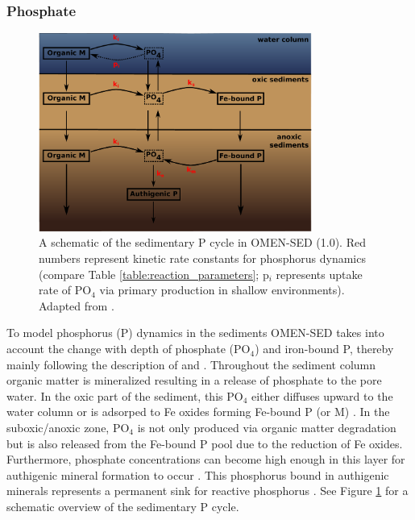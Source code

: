 \documentclass[gmd, manuscript]{copernicus}
\begin{document}
\subsubsection{Phosphate}
\begin{figure}[htbp]
\begin{center}
	\includegraphics[width=0.8\textwidth]{figures/P-cycle.pdf}
	\caption{A schematic of the sedimentary P cycle in OMEN-SED (1.0). Red numbers represent kinetic rate constants for phosphorus dynamics (compare Table \ref{table:reaction_parameters}; p$_i$ represents uptake rate of PO$_4$ 
	via primary production in shallow environments). Adapted from \citet{caroline_p_slomp_key_1996}.}
	\label{fig:P-cycle}
	\end{center}
\end{figure}
To model phosphorus (P) dynamics in the sediments OMEN-SED takes into account the change with depth of phosphate (PO$_4$) and iron-bound P, thereby mainly following the description of \citet{caroline_p_slomp_key_1996} 
and \citet{gypens_simple_2008}. Throughout the sediment column organic matter is mineralized resulting in a release of phosphate to the pore water. In the oxic part of the sediment, this PO$_4$ either 
diffuses upward to the water column or is adsorped to Fe oxides forming Fe-bound P (or M) \citep{slomp1998role}. In the suboxic/anoxic zone, PO$_4$ is not only produced via organic matter degradation but is 
also released from the Fe-bound P pool due to the reduction of Fe oxides. Furthermore, phosphate concentrations can become high enough in this layer for authigenic mineral formation to occur \citep{cappellen_mathematical_1988}. 
This phosphorus bound in authigenic minerals represents a permanent sink for reactive phosphorus \citep{caroline_p_slomp_key_1996}. See Figure \ref{fig:P-cycle} for a schematic overview of the sedimentary P cycle. 
\end{document}
